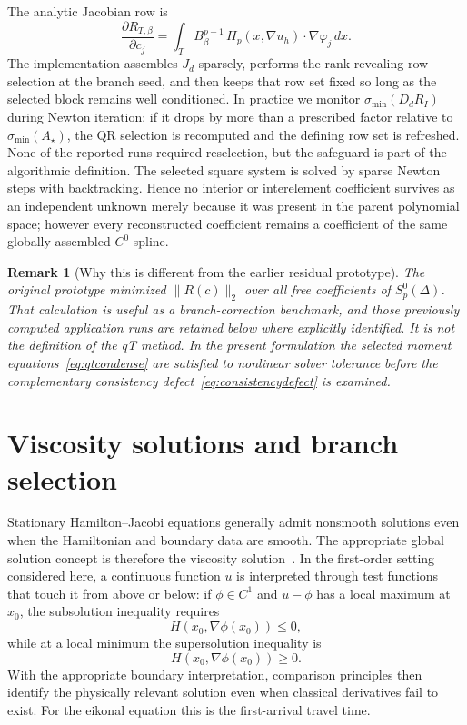 \documentclass[preprint,12pt]{elsarticle}
\newtheorem{remark}[theorem]{Remark}
\newcommand{\grad}{\nabla}
\begin{document}
The analytic Jacobian row is
\begin{equation}\label{eq:jac}
 \frac{\partial R_{T,\beta}}{\partial c_j}
 =\int_T B^{p-1}_\beta\,
 H_p(x,\grad u_h)\cdot\grad\varphi_j\,dx.
\end{equation}
The implementation assembles $J_d$ sparsely, performs the rank-revealing row selection at the branch seed, and then keeps that row set fixed so long as the selected block remains well conditioned.  In practice we monitor $\sigma_{\min}(D_dR_I)$ during Newton iteration; if it drops by more than a prescribed factor relative to $\sigma_{\min}(A_\star)$, the QR selection is recomputed and the defining row set is refreshed.  None of the reported runs required reselection, but the safeguard is part of the algorithmic definition.  The selected square system is solved by sparse Newton steps with backtracking.  Hence no interior or interelement coefficient survives as an independent unknown merely because it was present in the parent polynomial space; however every reconstructed coefficient remains a coefficient of the same globally assembled $C^0$ spline.

\begin{remark}[Why this is different from the earlier residual prototype]\label{rem:lsproto}
The original prototype minimized $\|R(c)\|_2$ over all free coefficients of $S_p^0(\Delta)$.  That calculation is useful as a branch-correction benchmark, and those previously computed application runs are retained below where explicitly identified.  It is not the definition of the qT method.  In the present formulation the selected moment equations~\eqref{eq:qtcondense} are satisfied to nonlinear solver tolerance before the complementary consistency defect~\eqref{eq:consistencydefect} is examined.
\end{remark}

\section{Viscosity solutions and branch selection}\label{sec:viscosity}
Stationary Hamilton--Jacobi equations generally admit nonsmooth solutions even when the Hamiltonian and boundary data are smooth.  The appropriate global solution concept is therefore the viscosity solution~\cite{CrandallIshiiLions1992}.  In the first-order setting considered here, a continuous function $u$ is interpreted through test functions that touch it from above or below: if $\phi\in C^1$ and $u-\phi$ has a local maximum at $x_0$, the subsolution inequality requires
\[
   H(x_0,\grad\phi(x_0))\le 0,
\]
while at a local minimum the supersolution inequality is
\[
   H(x_0,\grad\phi(x_0))\ge 0.
\]
With the appropriate boundary interpretation, comparison principles then identify the physically relevant solution even when classical derivatives fail to exist.  For the eikonal equation this is the first-arrival travel time.
\end{document}
